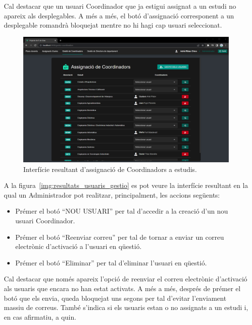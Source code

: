 \documentclass[a4paper,12pt]{ThesisStyle}
\begin{document}
Cal destacar que un usuari Coordinador que ja estigui assignat a un estudi no apareix als desplegables. A més a més, el botó d'assignació corresponent a un desplegable romandrà bloquejat mentre no hi hagi cap usuari seleccionat.

\begin{figure}[H]
  \centering
  \includegraphics[width=\textwidth]{assets/results/usuaris/assignacio.png}
  \caption{\label{img:resultats_usuaris_assignacio}Interfície resultant d'assignació de Coordinadors a estudis.}
\end{figure}

\newpage

A la figura~\ref{img:resultats_usuaris_gestio} es pot veure la interfície resultant en la qual un Administrador pot realitzar, principalment, les accions següents:
\begin{itemize}
  \item Prémer el botó ``NOU USUARI'' per tal d'accedir a la creació d'un nou usuari Coordinador.
  \item Prémer el botó ``Reenviar correu'' per tal de tornar a enviar un correu electrònic d'activació a l'usuari en qüestió.
  \item Prémer el botó ``Eliminar'' per tal d'eliminar l'usuari en qüestió.
\end{itemize}

Cal destacar que només apareix l'opció de reenviar el correu electrònic d'activació als usuaris que encara no han estat activats. A més a més, després de prémer el botó que els envia, queda bloquejat uns segons per tal d'evitar l'enviament massiu de correus. També s'indica si els usuaris estan o no assignats a un estudi i, en cas afirmatiu, a quin.
\end{document}
